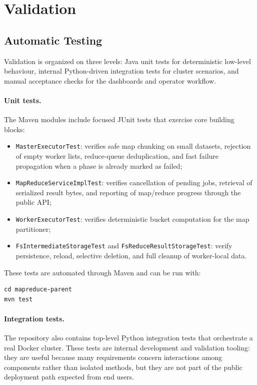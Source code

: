 \documentclass{scrartcl}
\begin{document}
\section{Validation}\label{validation}

\subsection{Automatic Testing}\label{automatic-testing}
Validation is organized on three levels: Java unit tests for deterministic low-level behaviour, internal Python-driven integration tests for cluster scenarios, and manual acceptance checks for the dashboards and operator workflow.

\paragraph{Unit tests.}
The Maven modules include focused JUnit tests that exercise core building blocks:
%
\begin{itemize}
    \item \texttt{MasterExecutorTest}: verifies safe map chunking on small datasets, rejection of empty worker lists, reduce-queue deduplication, and fast failure propagation when a phase is already marked as failed;
    \item \texttt{MapReduceServiceImplTest}: verifies cancellation of pending jobs, retrieval of serialized result bytes, and reporting of map/reduce progress through the public API;
    \item \texttt{WorkerExecutorTest}: verifies deterministic bucket computation for the map partitioner;
    \item \texttt{FsIntermediateStorageTest} and \texttt{FsReduceResultStorageTest}: verify persistence, reload, selective deletion, and full cleanup of worker-local data.
\end{itemize}

These tests are automated through Maven and can be run with:
%
\begin{verbatim}
cd mapreduce-parent
mvn test
\end{verbatim}

\paragraph{Integration tests.}
The repository also contains top-level Python integration tests that orchestrate a real Docker cluster. These tests are internal development and validation tooling: they are useful because many requirements concern interactions among components rather than isolated methods, but they are not part of the public deployment path expected from end users.
\end{document}
